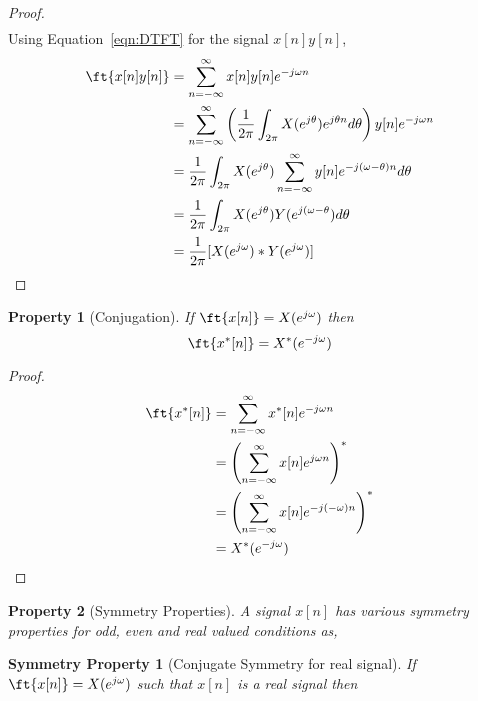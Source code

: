 \documentclass{home_assignment}
\newtheorem{theorem}{Property}
\newtheorem{subtheorem}{Symmetry Property}[theorem]
\begin{document}
{\begin{proof}
\begin{equation*}
\begin{aligned}
    \end{aligned}
    \end{equation*}
    Using Equation~\ref{eqn:DTFT} for the signal $x[n]y[n]$,
    \begin{equation*}
        \begin{aligned} 
           \ft{x[n]y[n]}&=\sum_{n=-\infty}^{\infty} x[n]y[n] e^{-j\omega n}\\
           &=\sum_{n=-\infty}^{\infty} \left(\frac{1}{2\pi}\int_{2\pi}X(e^{j\theta})e^{j\theta n} d\theta\right)y[n] e^{-j\omega n}\\
           &=\frac{1}{2\pi}\int_{2\pi}X(e^{j\theta})\sum_{n=-\infty}^{\infty}y[n] e^{-j(\omega-\theta) n} d\theta\\
           &=\frac{1}{2\pi}\int_{2\pi}X(e^{j\theta})Y(e^{j(\omega-\theta})d\theta\\
           &=\frac{1}{2\pi}[X(e^{j\omega})*Y(e^{j\omega})]
        \end{aligned}
        \end{equation*}
    \end{proof}
    \begin{theorem}[Conjugation]
        If $\ft{x[n]}=X(e^{j\omega})$ then
        \begin{equation*}
        \ft{x^*[n]}=X^*(e^{-j\omega})
        \end{equation*}
        \end{theorem}
        \begin{proof}
        \begin{equation*}
        \begin{aligned} 
            \ft{x^*[n]}&=\sum_{n=-\infty}^{\infty} x^*[n] e^{-j\omega n}\\
            &=\left(\sum_{n=-\infty}^{\infty} x[n] e^{j\omega n}\right)^*\\
            &=\left(\sum_{n=-\infty}^{\infty} x[n] e^{-j(-\omega) n}\right)^*\\
            &=X^*(e^{-j\omega})
        \end{aligned}
        \end{equation*}
        \end{proof}
        \begin{theorem}[Symmetry Properties]
            A signal $x[n]$ has various symmetry properties for odd, even and real valued conditions as,
            \end{theorem}
            \begin{subtheorem}[Conjugate Symmetry for real signal]
                If $\ft{x[n]}=X(e^{j\omega})$ such that $x[n]$ is a real signal then

\end{subtheorem}}
\end{document}

